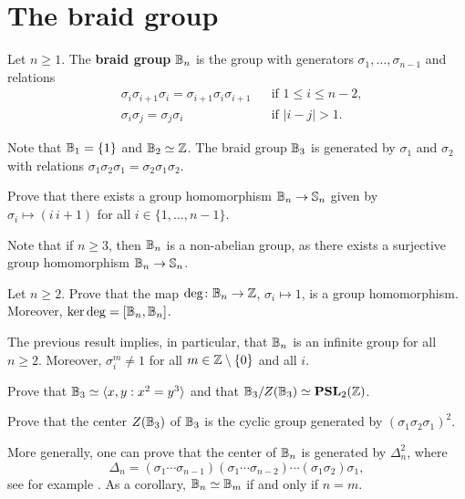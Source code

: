 \section{The braid group}

\begin{definition}
    Let $n\geq1$. The \textbf{braid group} $\mathbb{B}_n$ is
    the group with generators $\sigma_1,\dots,\sigma_{n-1}$ and
    relations
    \begin{align*}
        &\sigma_i\sigma_{i+1}\sigma_i=\sigma_{i+1}\sigma_i\sigma_{i+1} && \text{if }1\leq i\leq n-2,\\
        &\sigma_i\sigma_j=\sigma_j\sigma_i && \text{if }|i-j|> 1.
    \end{align*}
\end{definition}

Note that $\mathbb{B}_1=\{1\}$ and $\mathbb{B}_2\simeq\mathbb{Z}$. The braid 
group $\mathbb{B}_3$ is generated by
$\sigma_1$ and $\sigma_2$ with relations
$\sigma_1\sigma_2\sigma_1=\sigma_2\sigma_1\sigma_2$.

\begin{exercise}
    Prove that there exists a group homomorphism $\mathbb{B}_n\to\mathbb{S}_n$ 
    given by $\sigma_i\mapsto (i\,i+1)$ for all $i\in\{1,\dots,n-1\}$. 
\end{exercise}

Note that if $n\geq3$, then 
$\mathbb{B}_n$ is a non-abelian group, as there exists a surjective
group homomorphism $\mathbb{B}_n\to\mathbb{S}_n$. 

\begin{exercise}
    Let $n\geq 2$. 
    Prove that the map $\deg\colon\mathbb{B}_n\to\mathbb{Z}$, $\sigma_i\mapsto 1$, 
    is a group homomorphism. Moreover, $\ker\deg=[\mathbb{B}_n,\mathbb{B}_n]$. 
\end{exercise}

The previous result implies, in particular, that $\mathbb{B}_n$ is an infinite 
group for all $n\geq2$. Moreover, $\sigma_i^m\ne1$ for all $m\in\mathbb{Z}\setminus\{0\}$ and all $i$.  

\begin{exercise}
    Prove that $\mathbb{B}_3\simeq\langle x,y:x^2=y^3\rangle$ and that 
    $\mathbb{B}_3/Z(\mathbb{B}_3)\simeq\mathbf{PSL}_2(\mathbb{Z})$. 
\end{exercise}

\begin{exercise}
    Prove that the center $Z(\mathbb{B}_3)$ of $\mathbb{B}_3$ is
    the cyclic group generated by $(\sigma_1\sigma_2\sigma_1)^2$.
\end{exercise}

More generally, one can prove that
the center of $\mathbb{B}_n$ is generated by $\Delta_n^2$, where
\[
\Delta_n=(\sigma_1\cdots\sigma_{n-1})(\sigma_1\cdots\sigma_{n-2})\cdots(\sigma_1\sigma_2)\sigma_1, 
\]
see for example \cite[Theorem 1.24]{MR2435235}. 
As a corollary, $\mathbb{B}_n\simeq\mathbb{B}_m$ if and only if $n=m$. 

